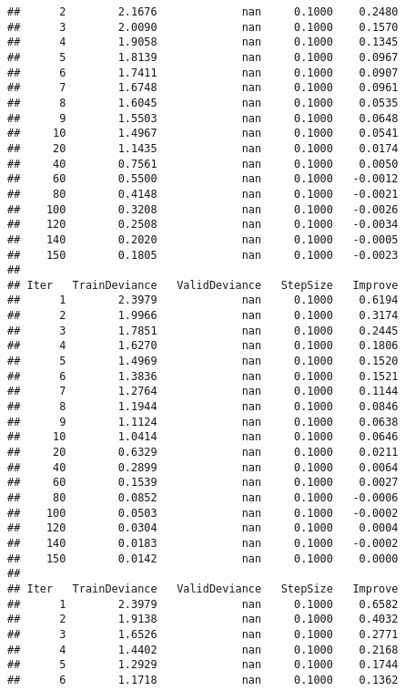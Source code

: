 \documentclass[]{article}
\begin{document}
\begin{verbatim}
##      2        2.1676             nan     0.1000    0.2480
##      3        2.0090             nan     0.1000    0.1570
##      4        1.9058             nan     0.1000    0.1345
##      5        1.8139             nan     0.1000    0.0967
##      6        1.7411             nan     0.1000    0.0907
##      7        1.6748             nan     0.1000    0.0961
##      8        1.6045             nan     0.1000    0.0535
##      9        1.5503             nan     0.1000    0.0648
##     10        1.4967             nan     0.1000    0.0541
##     20        1.1435             nan     0.1000    0.0174
##     40        0.7561             nan     0.1000    0.0050
##     60        0.5500             nan     0.1000   -0.0012
##     80        0.4148             nan     0.1000   -0.0021
##    100        0.3208             nan     0.1000   -0.0026
##    120        0.2508             nan     0.1000   -0.0034
##    140        0.2020             nan     0.1000   -0.0005
##    150        0.1805             nan     0.1000   -0.0023
## 
## Iter   TrainDeviance   ValidDeviance   StepSize   Improve
##      1        2.3979             nan     0.1000    0.6194
##      2        1.9966             nan     0.1000    0.3174
##      3        1.7851             nan     0.1000    0.2445
##      4        1.6270             nan     0.1000    0.1806
##      5        1.4969             nan     0.1000    0.1520
##      6        1.3836             nan     0.1000    0.1521
##      7        1.2764             nan     0.1000    0.1144
##      8        1.1944             nan     0.1000    0.0846
##      9        1.1124             nan     0.1000    0.0638
##     10        1.0414             nan     0.1000    0.0646
##     20        0.6329             nan     0.1000    0.0211
##     40        0.2899             nan     0.1000    0.0064
##     60        0.1539             nan     0.1000    0.0027
##     80        0.0852             nan     0.1000   -0.0006
##    100        0.0503             nan     0.1000   -0.0002
##    120        0.0304             nan     0.1000    0.0004
##    140        0.0183             nan     0.1000   -0.0002
##    150        0.0142             nan     0.1000    0.0000
## 
## Iter   TrainDeviance   ValidDeviance   StepSize   Improve
##      1        2.3979             nan     0.1000    0.6582
##      2        1.9138             nan     0.1000    0.4032
##      3        1.6526             nan     0.1000    0.2771
##      4        1.4402             nan     0.1000    0.2168
##      5        1.2929             nan     0.1000    0.1744
##      6        1.1718             nan     0.1000    0.1362

\end{verbatim}
\end{document}
